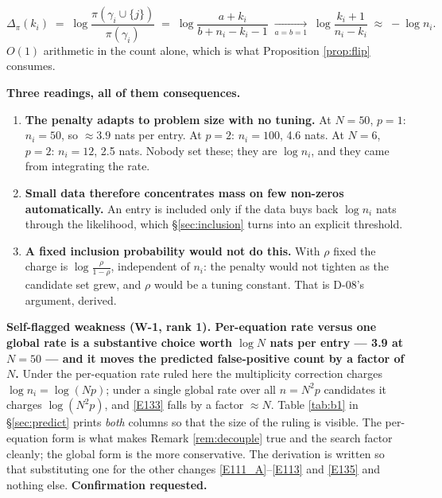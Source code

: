 \begin{corollary}\label{cor:price}
\begin{equation}
\Delta_\pi(k_i) \;=\; \log\frac{\pi(\gamma_i\cup\{j\})}{\pi(\gamma_i)} \;=\;
\log\frac{a+k_i}{b+n_i-k_i-1} \;\xrightarrow[a=b=1]{\qquad}\;
\log\frac{k_i+1}{n_i-k_i} \;\approx\; -\log n_i.
\tag{E-113}\label{E113}
\end{equation}
$O(1)$ arithmetic in the count alone, which is what Proposition \ref{prop:flip}
consumes.
\end{corollary}

\noindent\textbf{Three readings, all of them consequences.}
\begin{enumerate}[label=(\alph*), topsep=0pt, itemsep=0pt]
\item \textbf{The penalty adapts to problem size with no tuning.} At $N=50$, $p=1$:
  $n_i=50$, so $\approx3.9$ nats per entry. At $p=2$: $n_i=100$, 4.6 nats. At $N=6$,
  $p=2$: $n_i=12$, 2.5 nats. Nobody set these; they are $\log n_i$, and they came
  from integrating the rate.
\item \textbf{Small data therefore concentrates mass on few non-zeros
  automatically.} An entry is included only if the data buys back $\log n_i$ nats
  through the likelihood, which \S\ref{sec:inclusion} turns into an explicit
  threshold.
\item \textbf{A fixed inclusion probability would not do this.} With $\rho$ fixed the
  charge is $\log\frac{\rho}{1-\rho}$, independent of $n_i$: the penalty would not
  tighten as the candidate set grew, and $\rho$ would be a tuning constant. That is
  D-08's argument, derived.
\end{enumerate}

\begin{recordbox}
\textbf{Self-flagged weakness (W-1, rank 1). Per-equation rate versus one global rate
is a substantive choice worth $\log N$ nats per entry --- 3.9 at $N=50$ --- and it
moves the predicted false-positive count by a factor of $N$.} Under the per-equation
rate ruled here the multiplicity correction charges $\log n_i=\log(Np)$; under a
single global rate over all $n=N^2p$ candidates it charges $\log(N^2p)$, and
\eqref{E133} falls by a factor $\approx N$. Table \ref{tab:b1} in \S\ref{sec:predict}
prints \emph{both} columns so that the size of the ruling is visible. The
per-equation form is what makes Remark \ref{rem:decouple} true and the search factor
cleanly; the global form is the more conservative. The derivation is written so that
substituting one for the other changes \eqref{E111_A}--\eqref{E113} and \eqref{E135}
and nothing else. \textbf{Confirmation requested.}
\end{recordbox}

